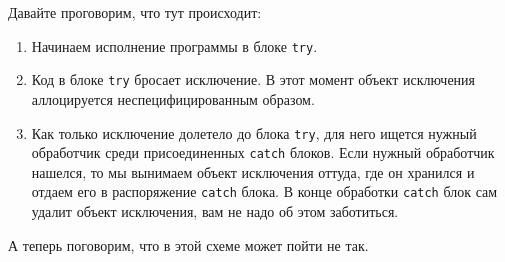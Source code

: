 Давайте проговорим, что тут происходит:
\begin{enumerate}
\item Начинаем исполнение программы в блоке \verb"try".

\item Код в блоке \verb"try" бросает исключение.
В этот момент объект исключения аллоцируется неспецифицированным образом.

\item Как только исключение долетело до блока \verb"try", для него ищется нужный обработчик среди присоединенных \verb"catch" блоков.
Если нужный обработчик нашелся, то мы вынимаем объект исключения оттуда, где он хранился и отдаем его в распоряжение \verb"catch" блока.
В конце обработки \verb"catch" блок сам удалит объект исключения, вам не надо об этом заботиться.
\end{enumerate}
А теперь поговорим, что в этой схеме может пойти не так.
